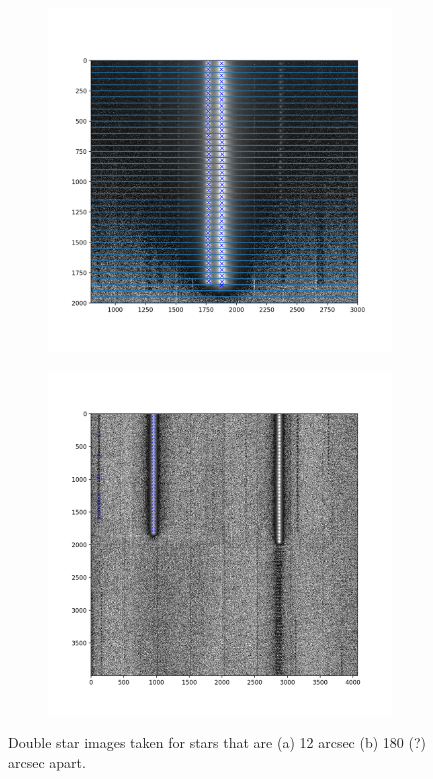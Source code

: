 \documentclass[SE,authoryear,toc]{lsstdoc}
\begin{document}
\begin{figure}[h]
\centering
\begin{subfigure}{.5\textwidth}
  \centering
  \includegraphics[width=1\linewidth]{20221012_close.png}
  \caption{}
  \label{fig:close}
\end{subfigure}%
\begin{subfigure}{.5\textwidth}
  \centering
  \includegraphics[width=1\linewidth]{20221012_far.png}
  \caption{}
  \label{fig:far}
\end{subfigure}
\caption{Double star images taken for stars that are (a) 12 arcsec (b) 180 (?) arcsec apart.}
\label{fig:images}
\end{figure}
\end{document}
